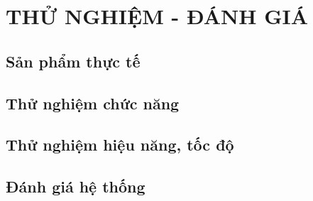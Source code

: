 \chapter{THỬ NGHIỆM - ĐÁNH GIÁ}
\section{Sản phẩm thực tế}
\section{Thử nghiệm chức năng}
\section{Thử nghiệm hiệu năng, tốc độ}
\section{Đánh giá hệ thống}
